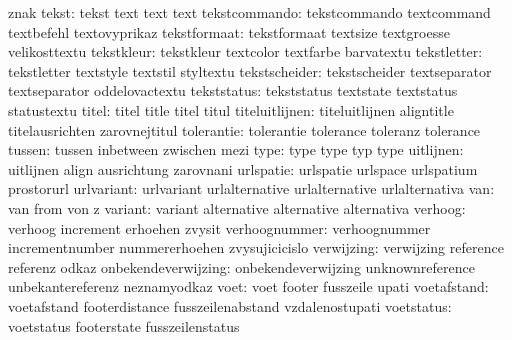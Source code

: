                        znak
               tekst:  tekst                text                 text
                       text
       tekstcommando:  tekstcommando        textcommand          textbefehl
                       textovyprikaz
        tekstformaat:  tekstformaat         textsize             textgroesse
                       velikosttextu
          tekstkleur:  tekstkleur           textcolor            textfarbe
                       barvatextu
         tekstletter:  tekstletter          textstyle            textstil
                       styltextu
       tekstscheider:  tekstscheider        textseparator        textseparator
                       oddelovactextu
         tekststatus:  tekststatus          textstate            textstatus
                       statustextu
               titel:  titel                title                titel
                       titul
      titeluitlijnen:  titeluitlijnen       aligntitle           titelausrichten
                       zarovnejtitul
          tolerantie:  tolerantie           tolerance            toleranz
                       tolerance
              tussen:  tussen               inbetween            zwischen
                       mezi
                type:  type                 type                 typ
                       type
           uitlijnen:  uitlijnen            align                ausrichtung
                       zarovnani
           urlspatie:  urlspatie            urlspace             urlspatium
                       prostorurl
          urlvariant:  urlvariant           urlalternative       urlalternative
                       urlalternativa
                 van:  van                  from                 von
                       z
             variant:  variant              alternative          alternative
                       alternativa
             verhoog:  verhoog              increment            erhoehen
                       zvysit
       verhoognummer:  verhoognummer        incrementnumber      nummererhoehen
                       zvysujicicislo
          verwijzing:  verwijzing           reference            referenz
                       odkaz
 onbekendeverwijzing:  onbekendeverwijzing  unknownreference     unbekantereferenz
                       neznamyodkaz
                voet:  voet                 footer               fusszeile
                       upati
         voetafstand:  voetafstand          footerdistance       fusszeilenabstand
                       vzdalenostupati
          voetstatus:  voetstatus           footerstate          fusszeilenstatus
